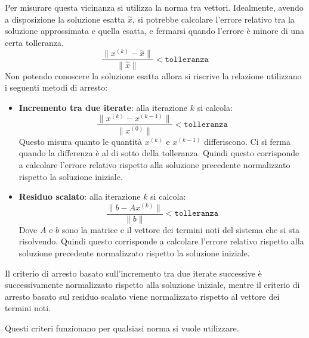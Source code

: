 Per misurare questa vicinanza si utilizza la norma tra vettori. Idealmente,
avendo a disposizione la soluzione esatta $\stackrel{\sim}{x}$, si potrebbe
calcolare l'errore relativo tra la soluzione approssimata e quella esatta, e
fermarsi quando l'errore è minore di una certa tolleranza.
\begin{equation}
    \frac{\|x^{(k)}-\stackrel{\sim}{x}\|}{\|\stackrel{\sim}{x}\|} < \texttt{tolleranza}
\end{equation}
Non potendo conoscere la soluzione esatta allora si riscrive la relazione utilizzano
i seguenti metodi di arresto:
\begin{itemize}
    \item \textbf{Incremento tra due iterate}: alla iterazione $k$ si calcola:
          \begin{equation*}
              \frac{\|x^{(k)}-x^{(k-1)}\|}{\|x^{(0)}\|}< \texttt{tolleranza}
          \end{equation*}
          Questo misura quanto le quantità $x^{(k)}$ e $x^{(k-1)}$ differiscono.
          Ci si ferma quando la differenza è al di sotto della tolleranza. Quindi
          questo corrisponde a calcolare l'errore relativo rispetto alla soluzione
          precedente normalizzato rispetto la soluzione iniziale.
    \item \textbf{Residuo scalato}: alla iterazione $k$ si calcola:
          \begin{equation*}
              \frac{\|b- Ax^{(k)}\|}{\|b\|}< \texttt{tolleranza}
          \end{equation*}
          Dove $A$ e $b$ sono la matrice e il vettore dei termini noti del sistema
          che si sta risolvendo. Quindi questo corrisponde a calcolare l'errore
          relativo rispetto alla soluzione precedente normalizzato rispetto la
          soluzione iniziale.
\end{itemize}
Il criterio di arresto basato sull'incremento tra due iterate successive è
successivamente normalizzato rispetto alla soluzione iniziale, mentre il criterio
di arresto basato sul residuo scalato viene normalizzato rispetto al vettore dei
termini noti.
\begin{nota}
    Questi criteri funzionano per qualsiasi norma si vuole utilizzare.
\end{nota}

